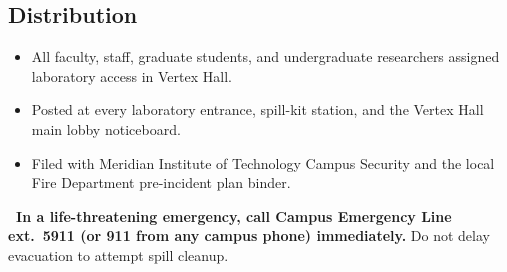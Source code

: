 \vspace{0.4em}

\subsection*{\color{spillnavy}Distribution}
\begin{itemize}
  \item All faculty, staff, graduate students, and undergraduate researchers assigned laboratory access in Vertex Hall.
  \item Posted at every laboratory entrance, spill-kit station, and the Vertex Hall main lobby noticeboard.
  \item Filed with Meridian Institute of Technology Campus Security and the local Fire Department pre-incident plan binder.
\end{itemize}

\begin{emergencybox}
\textbf{\large \hazicon{\faExclamationTriangle}\ In a life-threatening emergency, call Campus Emergency Line \textbf{ext.\ 5911} (or 911 from any campus phone) immediately.} Do not delay evacuation to attempt spill cleanup.
\end{emergencybox}
